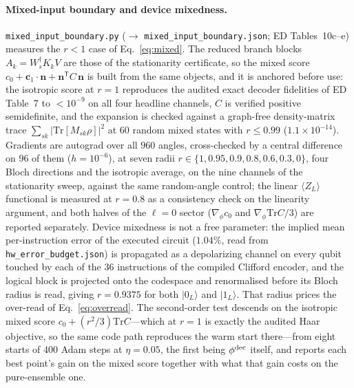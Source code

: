 \documentclass[aps,prxquantum,reprint,superscriptaddress]{revtex4-2}
\newcommand{\ket}[1]{\lvert #1\rangle}
\newcommand{\tr}{\mathrm{Tr}}
\begin{document}
\paragraph{Mixed-input boundary and device mixedness.}
\texttt{mixed\_input\_boundary.py} ($\to$
\texttt{mixed\_input\_boundary.json}; ED Tables~10c--e) measures the $r<1$ case of
Eq.~\eqref{eq:mixed}. The reduced branch blocks $A_k=W_s^\dagger K_kV$ are those
of the stationarity certificate, so the mixed score
$c_0+\mathbf c_1\!\cdot\!\mathbf n+\mathbf n^{\mathsf T}C\,\mathbf n$ is built from
the same objects, and it is anchored before use: the isotropic score at $r=1$
reproduces the audited exact decoder fidelities of ED Table~7 to $<10^{-9}$ on all
four headline channels, $C$ is verified positive semidefinite, and the expansion is
checked against a graph-free density-matrix trace
$\sum_{sk}|\tr[M_{sk}\rho]|^2$ at $60$ random mixed states with $r\le0.99$
($1.1\times10^{-14}$). Gradients are autograd over all $960$ angles,
cross-checked by a central difference on $96$ of them ($h=10^{-6}$), at seven
radii $r\in\{1,0.95,0.9,0.8,0.6,0.3,0\}$, four Bloch directions and the isotropic
average, on the nine channels of the stationarity sweep, against the same
random-angle control; the linear $\langle Z_L\rangle$ functional is measured at
$r=0.8$ as a consistency check on the linearity argument, and both halves of the
$\ell=0$ sector ($\nabla_\phi c_0$ and $\nabla_\phi\tr C/3$) are reported
separately. Device mixedness is not a free parameter: the implied mean
per-instruction error of the executed circuit ($1.04\%$, read from
\texttt{hw\_error\_budget.json}) is propagated as a depolarizing channel on every
qubit touched by each of the $36$ instructions of the compiled Clifford encoder,
and the logical block is projected onto the codespace and renormalised before its
Bloch radius is read, giving $r=0.9375$ for both $\ket{0_L}$ and $\ket{1_L}$. That
radius prices the over-read of Eq.~\eqref{eq:overread}. The second-order test
descends on the isotropic mixed score $c_0+(r^2/3)\tr C$---which at $r=1$ is
exactly the audited Haar objective, so the same code path reproduces the warm start
there---from eight starts of $400$ Adam steps at $\eta=0.05$, the first being
$\phi^{\rm dec}$ itself, and reports each best point's gain on the mixed score
together with what that gain costs on the pure-ensemble one.
\end{document}
